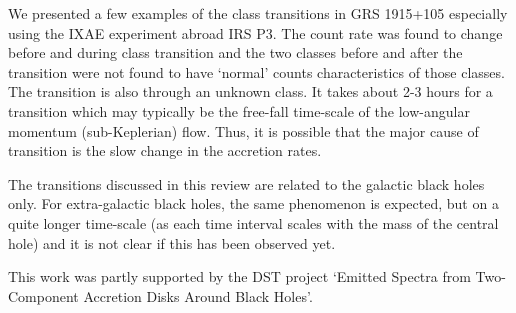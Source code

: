 \documentclass[referee]{cjaa}           %
\begin{document}
We presented a few examples of the class transitions in GRS 1915+105 especially using the IXAE experiment 
abroad IRS P3. The count rate was found to change before and during class transition
and the two classes before and after the transition were not found to have `normal' counts characteristics of 
those classes. The transition is also through an unknown class. It takes about 2-3 hours for a transition 
which may typically be the free-fall time-scale of the low-angular momentum (sub-Keplerian) flow. Thus,
it is possible that the major cause of transition is the slow change in the accretion rates.

The transitions discussed in this review are related to the galactic black holes only. For extra-galactic black holes,
the same phenomenon is expected, but on a quite longer time-scale (as each time interval scales with the 
mass of the central hole) and it is not clear if this has been observed yet.

\acknowledgements 
This work was partly supported by the DST project `Emitted Spectra from Two-Component 
Accretion Disks Around Black Holes'.
\end{document}
